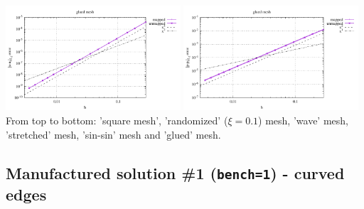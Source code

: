 \begin{center}
\includegraphics[width=6.5cm]{python_codes/fieldstone_76/results/bench1/straight/errors_V_mt6.pdf}
\includegraphics[width=6.5cm]{python_codes/fieldstone_76/results/bench1/straight/errors_P_mt6.pdf}\\
{\captionfont From top to bottom: 'square mesh', 'randomized' ($\xi=0.1$) mesh,
'wave' mesh, 'stretched' mesh, 'sin-sin' mesh and 'glued' mesh.}
\end{center}

\newpage
\subsection*{Manufactured solution \#1 ({\tt bench=1}) - curved edges}

